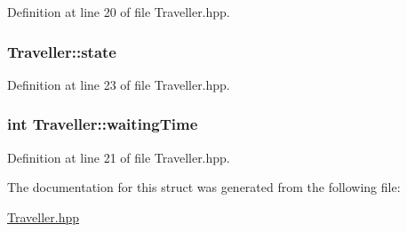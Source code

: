 Definition at line 20 of file Traveller.\+hpp.

\subsubsection[{\texorpdfstring{state}{state}}]{ Traveller\+::state}\hypertarget{structTraveller_a029215215a4f7630f2b7cac6e433a0ff}{}\label{structTraveller_a029215215a4f7630f2b7cac6e433a0ff}


Definition at line 23 of file Traveller.\+hpp.

\subsubsection[{\texorpdfstring{waiting\+Time}{waitingTime}}]{\setlength{\rightskip}{0pt plus 5cm}int Traveller\+::waiting\+Time}\hypertarget{structTraveller_a7b7690d3fc39f3cfda9ede916feb17c6}{}\label{structTraveller_a7b7690d3fc39f3cfda9ede916feb17c6}


Definition at line 21 of file Traveller.\+hpp.



The documentation for this struct was generated from the following file\+:\begin{DoxyCompactItemize}
\item 
\hyperlink{Traveller_8hpp}{Traveller.\+hpp}\end{DoxyCompactItemize}
